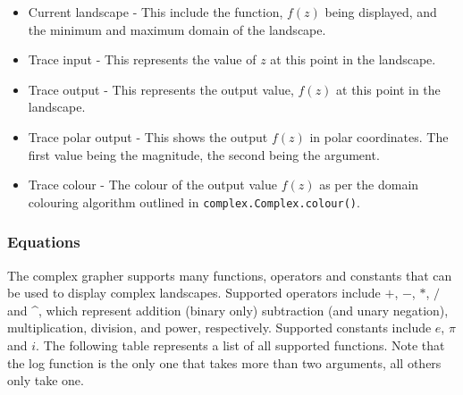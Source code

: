\documentclass{article}
\begin{document}
				\begin{itemize}
					\item Current landscape - This include the function, $f(z)$ being displayed, and the minimum and maximum domain of the landscape.
					\item Trace input - This represents the value of $z$ at this point in the landscape.
					\item Trace output - This represents the output value, $f(z)$ at this point in the landscape.
					\item Trace polar output - This shows the output $f(z)$ in polar coordinates. The first value being the magnitude, the second being the argument.
					\item Trace colour - The colour of the output value $f(z)$ as per the domain colouring algorithm outlined in \lstinline{complex.Complex.colour()}.
				\end{itemize}
				
			\subsubsection{Equations}
				The complex grapher supports many functions, operators and constants that can be used to display complex landscapes. Supported operators include $+$, $-$, $*$, $/$ and \^{}, which represent addition (binary only) subtraction (and unary negation), multiplication, division, and power, respectively. Supported constants include $e$, $\pi$ and $i$. The following table represents a list of all supported functions. Note that the log function is the only one that takes more than two arguments, all others only take one.
				
\end{document}
